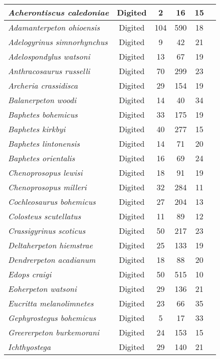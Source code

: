 \begin{tabular}{|L{4.5cm}|c|c|c|c|L{4.5cm}|}
\textit{Acherontiscus caledoniae}&Digited&2&16&15&\cite{Carr69a}\\\hline
\textit{Adamanterpeton ohioensis}&Digited&104&590&18&\cite{Miln98a}\\\hline
\textit{Adelogyrinus simnorhynchus}&Digited&9&42&21&\cite{Brou67b}\\\hline
\textit{Adelospondylus watsoni}&Digited&13&67&19&\cite{Carr67a}\\\hline
\textit{Anthracosaurus russelli}&Digited&70&299&23&\cite{Panc77a}\\\hline
\textit{Archeria crassidisca}&Digited&29&154&19&\cite{Clac12a}\\\hline
\textit{Balanerpeton woodi}&Digited&14&40&34&\cite{Miln94a}\\\hline
\textit{Baphetes bohemicus}&Digited&33&175&19&\cite{Beau77a}\\\hline
\textit{Baphetes kirkbyi}&Digited&40&277&15&\cite{Beau77a}\\\hline
\textit{Baphetes lintonensis}&Digited&14&71&20&\cite{Beau77a}\\\hline
\textit{Baphetes orientalis}&Digited&16&69&24&\cite{Miln09a}\\\hline
\textit{Chenoprosopus lewisi}&Digited&18&91&19&\cite{Hook93a}\\\hline
\textit{Chenoprosopus milleri}&Digited&32&284&11&\cite{Case13a}\\\hline
\textit{Cochleosaurus bohemicus}&Digited&27&204&13&\cite{Sequ03a}\\\hline
\textit{Colosteus scutellatus}&Digited&11&89&12&\cite{Hook83a}\\\hline
\textit{Crassigyrinus scoticus}&Digited&50&217&23&\cite{Panc85a}\\\hline
\textit{Deltaherpeton hiemstrae}&Digited&25&133&19&\cite{Bolt10a}\\\hline
\textit{Dendrerpeton acadianum}&Digited&18&88&20&\cite{Holm98a}\\\hline
\textit{Edops craigi}&Digited&50&515&10&\cite{Rome42a}\\\hline
\textit{Eoherpeton watsoni}&Digited&29&136&21&\cite{Smit85a}\\\hline
\textit{Eucritta melanolimnetes}&Digited&23&66&35&\cite{Clac98a}\\\hline
\textit{Gephyrostegus bohemicus}&Digited&5&17&33&\cite{Brou67a}\\\hline
\textit{Greererpeton burkemorani}&Digited&24&153&15&\cite{Bent90a}\\\hline
\textit{Ichthyostega}&Digited&29&140&21&\cite{Bent90a}\\\hline

\end{tabular}
